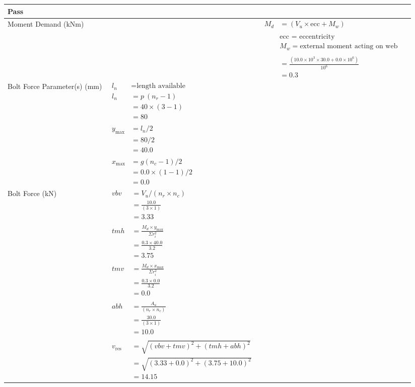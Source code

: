 \documentclass{article}%
\begin{document}
\begin{longtable}{|p{3.5cm}|p{5.3cm}|p{6.7cm}|p{1.5cm}|}
{\textbf{Pass}
}\\%
\hline%
Moment Demand (kNm)&&$\begin{aligned}  M_d &= (V_u \times \text{ecc} + M_w)\\ \\ & \text{ecc = eccentricity} \\ & M_w = \text{external moment acting on web} \\ \\  &= \frac{(10.0 \times 10^3 \times30.0 + 0.0\times10^6)}{10^6}\\  & =0.3\end{aligned}$&\textcolor{OsdagGreen}{ 
\textbf{}
}\\%
\hline%
Bolt Force Parameter(s) (mm)&$\begin{aligned} l_n~~~ &= \text{length available} \\  l_n~~~ &= p~(n_r - 1)\\  &= 40 \times (3 - 1)\\  & =80\\ \\  y_{\text{max}} &= l_n / 2\\  &= 80 / 2 \\  & =40.0\\ \\ x_{\text{max}} &= g(n_c - 1)/2 \\  &= 0.0 \times (1 - 1) / 2 \\  & =0.0\end{aligned}$&&\textcolor{OsdagGreen}{ 
\textbf{}
}\\%
\hline%
Bolt Force (kN)&$\begin{aligned} vbv~~ &= V_u / (n_r \times n_c)\\  &= \frac{10.0}{ (3\times1)}\\  & =3.33\\ \\ tmh~ &= \frac{M_d \times y_{\text{max}} }{ \Sigma r_i^2} \\  &= \frac{0.3\times40.0}{3.2}\\  & =3.75\\ \\  tmv ~&= \frac{M_d \times x_{\text{max}}}{\Sigma r_i^2}\\ &= \frac{0.3\times 0.0}{3.2}\\  & =0.0\\ \\  abh~ & = \frac{A_u }{(n_r \times n_c)}\\   & =\frac{30.0}{ (3 \times1)}\\  & =10.0\\ \\  v_{\text{res}} &=\sqrt{(vbv +tmv) ^ 2 + (tmh+abh) ^ 2}\\   &= \sqrt{(3.33 +0.0) ^2 + (3.75+10.0) ^ 2}\\  & =14.15\end{aligned}$&&\textcolor{OsdagGreen}{ 
}
\end{longtable}
\end{document}
